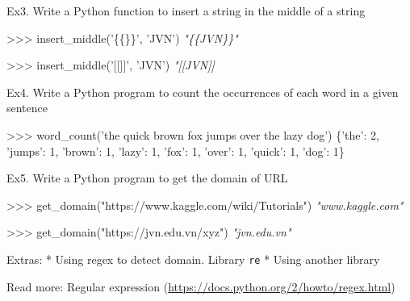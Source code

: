 \documentclass[11pt]{article}
\newenvironment{Shaded}{}{}
\newcommand{\DecValTok}[1]{\textcolor[rgb]{0.25,0.63,0.44}{{#1}}}
\newcommand{\StringTok}[1]{\textcolor[rgb]{0.25,0.44,0.63}{{#1}}}
\newcommand{\CommentTok}[1]{\textcolor[rgb]{0.38,0.63,0.69}{\textit{{#1}}}}
\newcommand{\NormalTok}[1]{{#1}}
\newcommand{\SpecialCharTok}[1]{\textcolor[rgb]{0.25,0.44,0.63}{{#1}}}
\newcommand{\OperatorTok}[1]{\textcolor[rgb]{0.40,0.40,0.40}{{#1}}}
\begin{document}
    Ex3. Write a Python function to insert a string in the middle of a
string

\begin{Shaded}
\begin{Highlighting}[]
\OperatorTok{>>>}\NormalTok{ insert_middle(}\StringTok{'}\SpecialCharTok{\{\{\}\}}\StringTok{'}\NormalTok{, }\StringTok{'JVN'}\NormalTok{)}
    \CommentTok{"\{\{JVN\}\}"}
    
\OperatorTok{>>>}\NormalTok{ insert_middle(}\StringTok{'[[]]'}\NormalTok{, }\StringTok{'JVN'}\NormalTok{)}
    \CommentTok{"[[JVN]]}
\end{Highlighting}
\end{Shaded}

    Ex4. Write a Python program to count the occurrences of each word in a
given sentence

\begin{Shaded}
\begin{Highlighting}[]
\OperatorTok{>>>}\NormalTok{ word_count(}\StringTok{'the quick brown fox jumps over the lazy dog'}\NormalTok{)}
\NormalTok{    \{}\StringTok{'the'}\NormalTok{: }\DecValTok{2}\NormalTok{, }\StringTok{'jumps'}\NormalTok{: }\DecValTok{1}\NormalTok{, }\StringTok{'brown'}\NormalTok{: }\DecValTok{1}\NormalTok{, }\StringTok{'lazy'}\NormalTok{: }\DecValTok{1}\NormalTok{, }\StringTok{'fox'}\NormalTok{: }\DecValTok{1}\NormalTok{, }\StringTok{'over'}\NormalTok{: }\DecValTok{1}\NormalTok{, }\StringTok{'quick'}\NormalTok{: }\DecValTok{1}\NormalTok{, }\StringTok{'dog'}\NormalTok{: }\DecValTok{1}\NormalTok{\} }
\end{Highlighting}
\end{Shaded}

    Ex5. Write a Python program to get the domain of URL

\begin{Shaded}
\begin{Highlighting}[]
\OperatorTok{>>>}\NormalTok{ get_domain(}\StringTok{"https://www.kaggle.com/wiki/Tutorials"}\NormalTok{)}
    \CommentTok{"www.kaggle.com"}

\OperatorTok{>>>}\NormalTok{ get_domain(}\StringTok{"https://jvn.edu.vn/xyz"}\NormalTok{)}
    \CommentTok{"jvn.edu.vn"}
\end{Highlighting}
\end{Shaded}

Extras: * Using regex to detect domain. Library \texttt{re} * Using
another library

    Read more: Regular expression
(\url{https://docs.python.org/2/howto/regex.html})
\end{document}
